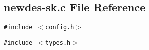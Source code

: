 \subsection{newdes-sk.c File Reference}
\label{newdes-sk_8c}
{\tt \#include $<$config.h$>$}\par
{\tt \#include $<$types.h$>$}\par
